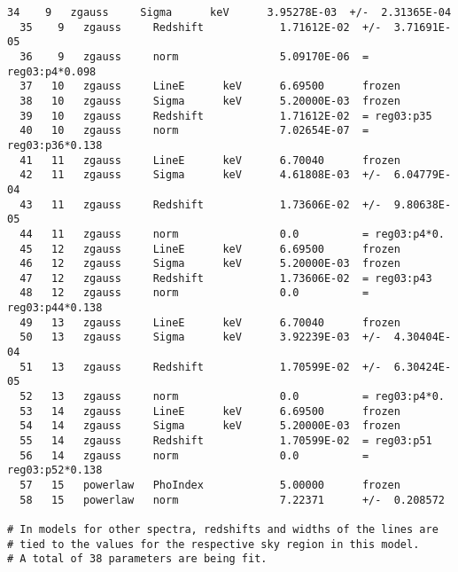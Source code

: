 \begin{lstlisting}[basicstyle=\ttfamily\scriptsize, frame=single]
  34    9   zgauss     Sigma      keV      3.95278E-03  +/-  2.31365E-04  
  35    9   zgauss     Redshift            1.71612E-02  +/-  3.71691E-05  
  36    9   zgauss     norm                5.09170E-06  = reg03:p4*0.098
  37   10   zgauss     LineE      keV      6.69500      frozen
  38   10   zgauss     Sigma      keV      5.20000E-03  frozen
  39   10   zgauss     Redshift            1.71612E-02  = reg03:p35
  40   10   zgauss     norm                7.02654E-07  = reg03:p36*0.138
  41   11   zgauss     LineE      keV      6.70040      frozen
  42   11   zgauss     Sigma      keV      4.61808E-03  +/-  6.04779E-04  
  43   11   zgauss     Redshift            1.73606E-02  +/-  9.80638E-05  
  44   11   zgauss     norm                0.0          = reg03:p4*0.
  45   12   zgauss     LineE      keV      6.69500      frozen
  46   12   zgauss     Sigma      keV      5.20000E-03  frozen
  47   12   zgauss     Redshift            1.73606E-02  = reg03:p43
  48   12   zgauss     norm                0.0          = reg03:p44*0.138
  49   13   zgauss     LineE      keV      6.70040      frozen
  50   13   zgauss     Sigma      keV      3.92239E-03  +/-  4.30404E-04  
  51   13   zgauss     Redshift            1.70599E-02  +/-  6.30424E-05  
  52   13   zgauss     norm                0.0          = reg03:p4*0.
  53   14   zgauss     LineE      keV      6.69500      frozen
  54   14   zgauss     Sigma      keV      5.20000E-03  frozen
  55   14   zgauss     Redshift            1.70599E-02  = reg03:p51
  56   14   zgauss     norm                0.0          = reg03:p52*0.138
  57   15   powerlaw   PhoIndex            5.00000      frozen
  58   15   powerlaw   norm                7.22371      +/-  0.208572     

# In models for other spectra, redshifts and widths of the lines are
# tied to the values for the respective sky region in this model. 
# A total of 38 parameters are being fit.
\end{lstlisting}

